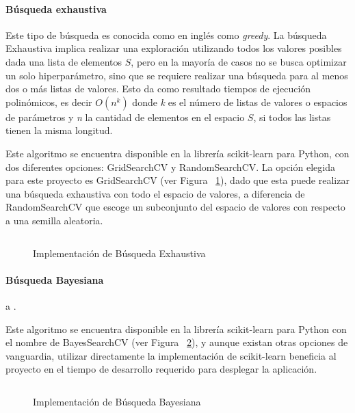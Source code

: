 \paragraph{Búsqueda exhaustiva} Este tipo de búsqueda es conocida como en inglés como \textit{greedy}. La búsqueda Exhaustiva implica realizar una exploración utilizando todos los valores posibles dada una lista de elementos $S$, pero en la mayoría de casos no se busca optimizar un solo hiperparámetro, sino que se requiere realizar una búsqueda para al menos dos o más listas de valores. Esto da como resultado tiempos de ejecución polinómicos, es decir $O(n^k)$ donde \textit{k} es el número de listas de valores o espacios de parámetros y \textit{n} la cantidad de elementos en el espacio $S$, si todos las listas tienen la misma longitud.

Este algoritmo se encuentra disponible en la librería scikit-learn \parencite{sklearn_api} para Python, con dos diferentes opciones: GridSearchCV y RandomSearchCV. La opción elegida para este proyecto es GridSearchCV (ver Figura ~\ref{fig:impbusexh}), dado que esta puede realizar una búsqueda exhaustiva con todo el espacio de valores, a diferencia de RandomSearchCV que escoge un subconjunto del espacio de valores con respecto a una semilla aleatoria.

\begin{figure}[H]
    \centering
    \caption{Implementación de Búsqueda Exhaustiva}
    \inputminted{Python}{pycode/gridsearch.py}
    \label{fig:impbusexh}
\end{figure}

\paragraph{Búsqueda Bayesiana}  a \parencite{Brochu2010}. 

Este algoritmo se encuentra disponible en la librería scikit-learn \parencite{sklearn_api} para Python con el nombre de BayesSearchCV (ver Figura ~\ref{fig:impbusbay}), y aunque existan otras opciones de vanguardia, utilizar directamente la implementación de scikit-learn beneficia al proyecto en el tiempo de desarrollo requerido para desplegar la aplicación.

\begin{figure}[H]
    \centering
    \caption{Implementación de Búsqueda Bayesiana}
    \inputminted{Python}{pycode/bayesiansearch.py}
    \label{fig:impbusbay}
\end{figure}


